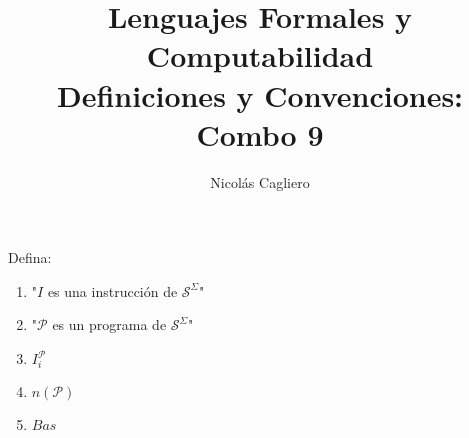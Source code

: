 \documentclass{article}
\title{Lenguajes Formales y Computabilidad \\
        \large Definiciones y Convenciones: Combo 9 }
\author{Nicolás Cagliero}
\begin{document}
\maketitle

Defina:

\begin{enumerate}
    \item "$I$ es una instrucción de $\mathcal{S}^{\Sigma}$"
    
    \item "$\mathcal{P}$ es un programa de $\mathcal{S}^{\Sigma}$"
    
    \item $I_i^{\mathcal{P}}$
    
    \item $n(\mathcal{P})$
    
    \item $Bas$
\end{enumerate}
\end{document}
